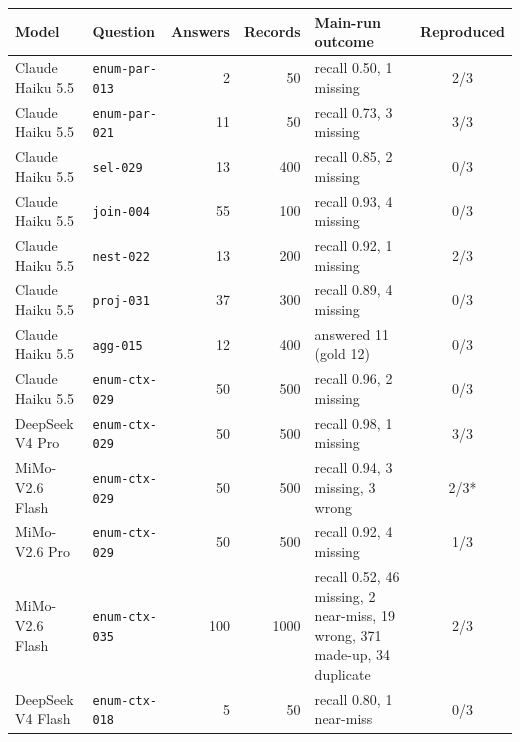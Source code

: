 \begin{tabular}{llrrp{5.2cm}c}
\toprule
Model & Question & Answers & Records & Main-run outcome & Reproduced \\
\midrule
Claude Haiku 5.5 & \texttt{enum-par-013} & 2 & 50 & recall 0.50, 1 missing & 2/3 \\
Claude Haiku 5.5 & \texttt{enum-par-021} & 11 & 50 & recall 0.73, 3 missing & 3/3 \\
Claude Haiku 5.5 & \texttt{sel-029} & 13 & 400 & recall 0.85, 2 missing & 0/3 \\
Claude Haiku 5.5 & \texttt{join-004} & 55 & 100 & recall 0.93, 4 missing & 0/3 \\
Claude Haiku 5.5 & \texttt{nest-022} & 13 & 200 & recall 0.92, 1 missing & 2/3 \\
Claude Haiku 5.5 & \texttt{proj-031} & 37 & 300 & recall 0.89, 4 missing & 0/3 \\
Claude Haiku 5.5 & \texttt{agg-015} & 12 & 400 & answered 11 (gold 12) & 0/3 \\
Claude Haiku 5.5 & \texttt{enum-ctx-029} & 50 & 500 & recall 0.96, 2 missing & 0/3 \\
DeepSeek V4 Pro & \texttt{enum-ctx-029} & 50 & 500 & recall 0.98, 1 missing & 3/3 \\
MiMo-V2.6 Flash & \texttt{enum-ctx-029} & 50 & 500 & recall 0.94, 3 missing, 3 wrong & 2/3* \\
MiMo-V2.6 Pro & \texttt{enum-ctx-029} & 50 & 500 & recall 0.92, 4 missing & 1/3 \\
MiMo-V2.6 Flash & \texttt{enum-ctx-035} & 100 & 1000 & recall 0.52, 46 missing, 2 near-miss, 19 wrong, 371 made-up, 34 duplicate & 2/3 \\
DeepSeek V4 Flash & \texttt{enum-ctx-018} & 5 & 50 & recall 0.80, 1 near-miss & 0/3 \\
\bottomrule
\end{tabular}

